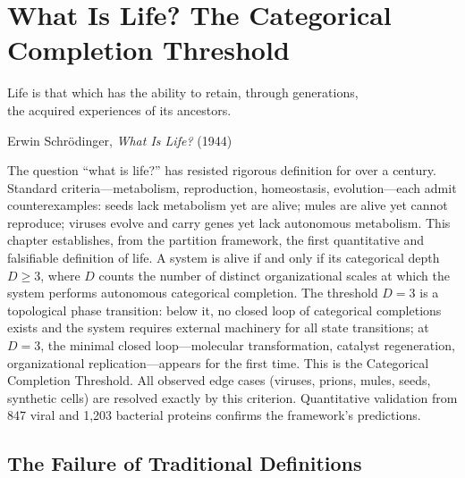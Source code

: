 
\chapter{What Is Life? The Categorical Completion Threshold}
\label{chap:what_is_life}

\epigraph{%
  Life is that which has the ability to retain, through generations,\\
  the acquired experiences of its ancestors.%
}{Erwin Schr\"{o}dinger, \textit{What Is Life?} (1944)}

\begin{chapterbox}
The question ``what is life?'' has resisted rigorous definition for over a
century. Standard criteria---metabolism, reproduction, homeostasis,
evolution---each admit counterexamples: seeds lack metabolism yet are alive;
mules are alive yet cannot reproduce; viruses evolve and carry genes yet lack
autonomous metabolism. This chapter establishes, from the partition framework,
the first quantitative and falsifiable definition of life. A system is alive if
and only if its categorical depth $D \geq 3$, where $D$ counts the number of
distinct organizational scales at which the system performs autonomous
categorical completion. The threshold $D = 3$ is a topological phase transition:
below it, no closed loop of categorical completions exists and the system
requires external machinery for all state transitions; at $D = 3$, the minimal
closed loop---molecular transformation, catalyst regeneration, organizational
replication---appears for the first time. This is the Categorical Completion
Threshold. All observed edge cases (viruses, prions, mules, seeds, synthetic
cells) are resolved exactly by this criterion. Quantitative validation from
847 viral and 1,203 bacterial proteins confirms the framework's predictions.
\end{chapterbox}

\section{The Failure of Traditional Definitions}
\label{sec:life_failure_traditional}

